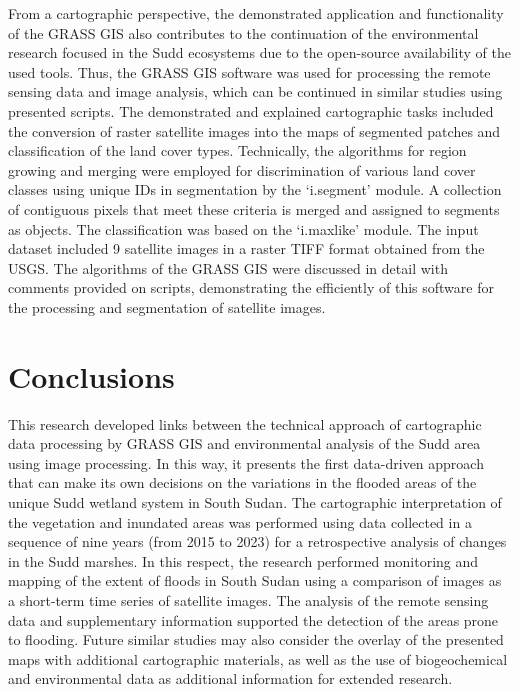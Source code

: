 \documentclass[analytics,article,accept,pdftex,moreauthors]{Definitions/mdpi}
\begin{document}
From a cartographic perspective, the demonstrated application and functionality of the GRASS GIS also contributes to the continuation of the environmental research focused in the Sudd ecosystems due to the open-source availability of the used tools. Thus, the GRASS GIS software was used for processing the remote sensing data and image analysis, which can be continued in similar studies using presented scripts. The demonstrated and explained cartographic tasks included the conversion of raster satellite images into the maps of segmented patches and classification of the land cover types. Technically, the algorithms for region growing and merging were employed for discrimination of various land cover classes using unique IDs in segmentation by the `i.segment' module. %
A collection of contiguous pixels that meet these criteria is merged and assigned to segments as objects. The classification was based on the `i.maxlike' module. The input dataset included 9 satellite images in a raster TIFF format obtained from the USGS. The algorithms of the GRASS GIS were discussed in detail with comments provided  on scripts,  demonstrating the efficiently of this software for the processing and segmentation of  satellite images. %

\section{Conclusions}

This research {developed}  links between the technical approach of cartographic data processing by GRASS GIS and environmental analysis of the Sudd area using image processing. In this way, it presents the first data-driven approach that can make its own decisions on the variations in the flooded areas of the unique Sudd wetland system in South Sudan. The cartographic interpretation of the vegetation and inundated areas was performed using data collected in a sequence of nine years (from 2015 to 2023) for a retrospective analysis of changes in the Sudd marshes. In this respect, the research performed monitoring and mapping of the extent of floods in South Sudan using a comparison of images as a short-term time series of satellite images. The analysis of the remote sensing data and supplementary information supported the detection of the areas prone to flooding. Future similar studies may also consider the overlay of the presented maps with additional cartographic materials, as well as the use of biogeochemical and environmental data as additional information for extended research. 
\end{document}
